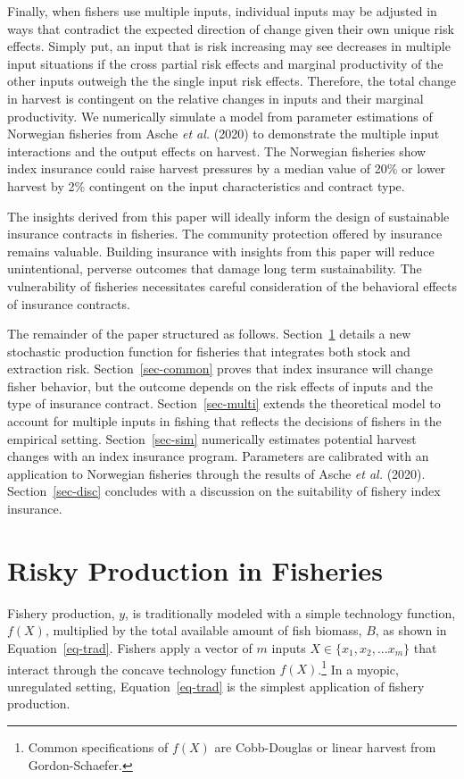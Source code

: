 \documentclass[
  letterpaper,
  DIV=11,
  numbers=noendperiod]{scrartcl}
\theoremstyle{plain}
\theoremstyle{plain}
\theoremstyle{remark}
\begin{document}
Finally, when fishers use multiple inputs, individual inputs may be
adjusted in ways that contradict the expected direction of change given
their own unique risk effects. Simply put, an input that is risk
increasing may see decreases in multiple input situations if the cross
partial risk effects and marginal productivity of the other inputs
outweigh the the single input risk effects. Therefore, the total change
in harvest is contingent on the relative changes in inputs and their
marginal productivity. We numerically simulate a model from parameter
estimations of Norwegian fisheries from Asche \emph{et al.} (2020) to
demonstrate the multiple input interactions and the output effects on
harvest. The Norwegian fisheries show index insurance could raise
harvest pressures by a median value of 20\% or lower harvest by 2\%
contingent on the input characteristics and contract type.

The insights derived from this paper will ideally inform the design of
sustainable insurance contracts in fisheries. The community protection
offered by insurance remains valuable. Building insurance with insights
from this paper will reduce unintentional, perverse outcomes that damage
long term sustainability. The vulnerability of fisheries necessitates
careful consideration of the behavioral effects of insurance contracts.

The remainder of the paper structured as follows. Section~\ref{sec-jp}
details a new stochastic production function for fisheries that
integrates both stock and extraction risk. Section~\ref{sec-common}
proves that index insurance will change fisher behavior, but the outcome
depends on the risk effects of inputs and the type of insurance
contract. Section~\ref{sec-multi} extends the theoretical model to
account for multiple inputs in fishing that reflects the decisions of
fishers in the empirical setting. Section~\ref{sec-sim} numerically
estimates potential harvest changes with an index insurance program.
Parameters are calibrated with an application to Norwegian fisheries
through the results of Asche \emph{et al.} (2020).
Section~\ref{sec-disc} concludes with a discussion on the suitability of
fishery index insurance.

\section{Risky Production in Fisheries}\label{sec-jp}

Fishery production, \(y\), is traditionally modeled with a simple
technology function, \(f(X)\), multiplied by the total available amount
of fish biomass, \(B\), as shown in Equation~\ref{eq-trad}. Fishers
apply a vector of \(m\) inputs \(X\in\{x_1,x_2,...x_m\}\) that interact
through the concave technology function \(f(X)\).\footnote{Common
  specifications of \(f(X)\) are Cobb-Douglas or linear harvest from
  Gordon-Schaefer.} In a myopic, unregulated setting,
Equation~\ref{eq-trad} is the simplest application of fishery
production.
\end{document}
